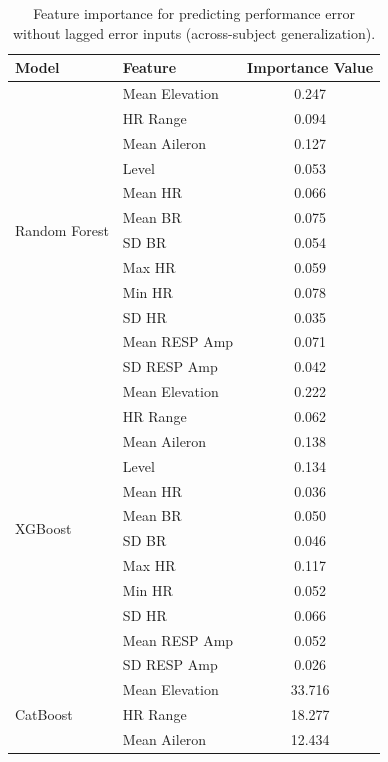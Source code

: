 \documentclass[11pt, a4paper]{article}
\begin{document}
\begin{table}[htbp]
	\centering
	\caption{Feature importance for predicting performance error without lagged error inputs (across-subject generalization).}
	\label{tab:feat_imp_subject_no_lag}
	\small
	\begin{tabular}{llc}
		Model & Feature  & Importance Value\\
		\midrule
		\multirow{12}{*}{Random Forest} &Mean Elevation & 0.247\\
										&HR Range       & 0.094\\
										&Mean Aileron         & 0.127\\
										&Level     	& 0.053 \\
										&Mean HR             & 0.066\\
										&Mean BR             & 0.075\\
										&SD BR              & 0.054\\
										&Max HR              & 0.059 \\
										&Min HR              & 0.078\\
										&SD HR             & 0.035\\
										&Mean RESP Amp       & 0.071\\
										&SD RESP Amp        & 0.042 \\								
		\midrule
		\multirow{12}{*}{XGBoost}		&Mean Elevation & 0.222\\
										&HR Range       & 0.062\\
										&Mean Aileron         & 0.138\\
										&Level      & 0.134 \\
										&Mean HR             & 0.036\\
										&Mean BR             & 0.050\\
										&SD BR              & 0.046\\
										&Max HR             & 0.117 \\
										&Min HR              & 0.052 \\
										&SD HR             & 0.066\\
										&Mean RESP Amp       & 0.052\\
										&SD RESP Amp		& 0.026 \\
		\midrule											 
		\multirow{12}{*}{CatBoost}		&Mean Elevation & 33.716 \\
										&HR Range       & 18.277 \\
										&Mean Aileron         & 12.434 \\

\end{tabular}
\end{table}
\end{document}
